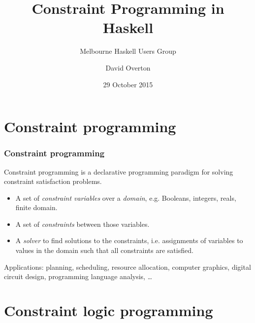 \documentclass[aspectratio=169,hyphens]{beamer} %
\title{Constraint Programming in Haskell}
\subtitle{Melbourne Haskell Users Group}
\author{David Overton}
\date{29 October 2015}
\begin{document}
\frame{\titlepage}

\section{Constraint programming}

\begin{frame}
    \frametitle{Constraint programming}
    Constraint programming is a declarative programming paradigm for solving constraint satisfaction problems.
    \pause
    \begin{itemize}
        \item A set of \emph{constraint variables} over a \emph{domain}, e.g. Booleans, integers, reals, finite domain.
    \pause
        \item A set of \emph{constraints} between those variables.
    \pause
        \item A \emph{solver} to find solutions to the constraints, i.e. assignments of variables to values in the domain such that all constraints are satisfied.
    \end{itemize}
    \pause
    Applications: planning, scheduling, resource allocation, computer graphics, digital circuit design, programming language analysis, \ldots
\end{frame}

\section{Constraint logic programming}
\end{document}
